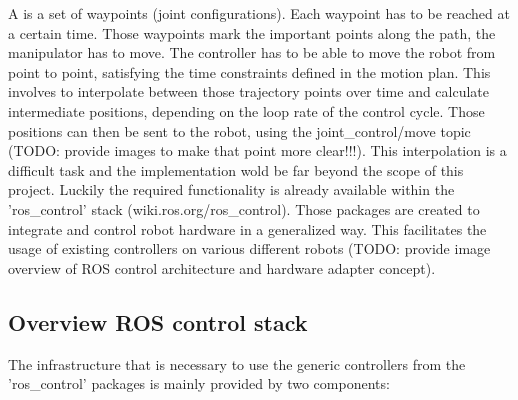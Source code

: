 A is a set of waypoints (joint configurations). Each waypoint has to be reached at a certain time.
Those waypoints mark the important points along the path, the manipulator has to move. The controller has to be able to move the robot from point to point, satisfying the time constraints defined in the motion plan. This involves to interpolate between those trajectory points over time and calculate intermediate positions, depending on the loop rate of the control cycle. Those positions can then be sent to the robot, using the joint\_control/move topic (TODO: provide images to make that point more clear!!!). This interpolation is a difficult task and the implementation wold be far beyond the scope of this project. Luckily the required functionality is already available within the 'ros\_control' stack (wiki.ros.org/ros\_control). Those packages are created to integrate and control robot hardware in a generalized way. This facilitates the usage of existing controllers on various different robots (TODO: provide image overview of ROS control architecture and hardware adapter concept).

\subsection{Overview ROS control stack}

The infrastructure that is necessary to use the generic controllers from the 'ros\_control' packages is mainly provided by two components:

